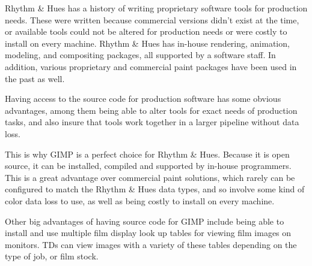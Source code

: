 Rhythm \& Hues has a history of writing proprietary software tools for
production needs. These were written because commercial versions didn't exist at
the time, or available tools could not be altered for production needs or were
costly to install on every machine. Rhythm \& Hues has in-house rendering,
animation, modeling, and compositing packages, all supported by a software
staff. In addition, various proprietary and commercial paint packages have been
used in the past as well.

Having access to the source code for production software has some obvious
advantages, among them being able to alter tools for exact needs of production
tasks, and also insure that tools work together in a larger pipeline without
data loss.

This is why GIMP is a perfect choice for Rhythm \& Hues. Because it is open
source, it can be installed, compiled and supported by in-house programmers.
This is a great advantage over commercial paint solutions, which rarely can be
configured to match the Rhythm \& Hues data types, and so involve some kind of
color data loss to use, as well as being costly to install on every machine.

Other big advantages of having source code for GIMP include being able to
install and use multiple film display look up tables for viewing film images on
monitors. TDs can view images with a variety of these tables depending on the
type of job, or film stock.
